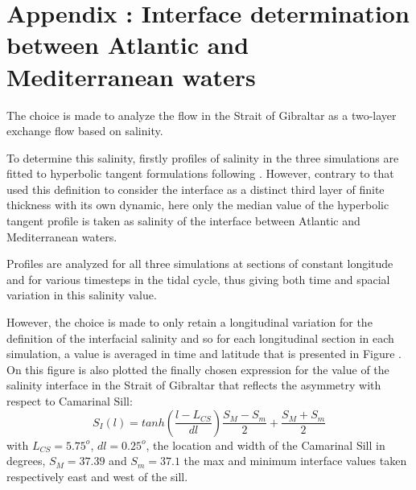  \color{red}
\section{Appendix : Interface determination between Atlantic and Mediterranean waters}
\label{appendix_interface}

The choice is made to analyze the flow in the Strait of Gibraltar as a two-layer exchange flow based on salinity. 

To determine this salinity, firstly profiles of salinity in the three simulations are fitted to hyperbolic tangent formulations following \citet{sannino_2007}. However, contrary to \citet{sannino_2007} that used this definition to consider the interface as a distinct third layer of finite thickness with its own dynamic, here only the median value of the hyperbolic tangent profile is taken as salinity of the interface between Atlantic and Mediterranean waters. 


Profiles are analyzed for all three simulations at sections of constant longitude and for various timesteps in the tidal cycle, thus giving both time and spacial variation in this salinity value.

However, the choice is made to only retain a longitudinal variation for the definition of the interfacial salinity and so for each longitudinal section in each simulation, a value is averaged in time and latitude that is presented in Figure . On this figure is also plotted the finally chosen expression for the value of the salinity interface in the Strait of Gibraltar that reflects the asymmetry with respect to Camarinal Sill:
\begin{equation}
	S_I(l)=tanh(\frac{l-L_{CS}}{dl})\frac{S_M-S_m}{2}+\frac{S_M+S_m}{2}
	\label{eqSinterface}
\end{equation}
with $L_{CS}=5.75^o$, $dl=0.25^o$, the location and width of the Camarinal Sill in degrees, $S_M=37.39$ and $S_m=37.1$ the max and minimum interface values taken respectively east and west of the sill.

